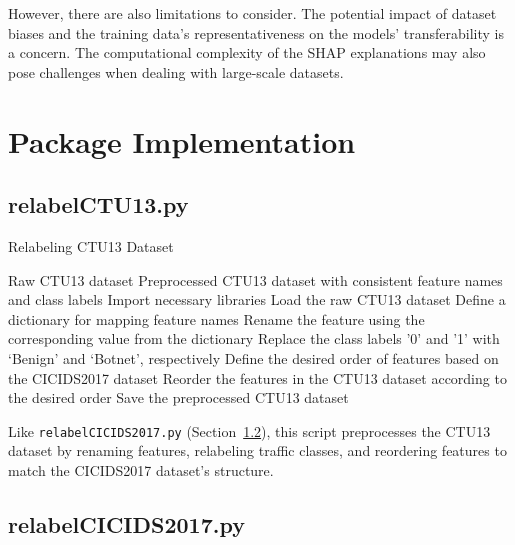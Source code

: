 However, there are also limitations to consider. The potential impact of dataset biases and the training data's representativeness on the models' transferability is a concern. The computational complexity of the SHAP explanations may also pose challenges when dealing with large-scale datasets.

\section{Package Implementation}\label{sec:package-implementation}

\subsection{relabelCTU13.py}\label{subsec:relabelCTU13.py}

\begin{algorithm}[H]
\caption{Relabeling CTU13 Dataset}\label{alg:relabelCTU13}
\begin{algorithmic}[1]
\Require%
Raw CTU13 dataset
\Ensure%
Preprocessed CTU13 dataset with consistent feature names and class labels
\State%
Import necessary libraries
\State%
Load the raw CTU13 dataset
\State%
Define a dictionary for mapping feature names
        \State%
        Rename the feature using the corresponding value from the dictionary
    \EndIf%
\EndFor%
\State%
Replace the class labels '0' and '1' with `Benign' and `Botnet', respectively 
\State%
Define the desired order of features based on the CICIDS2017 dataset
\State%
Reorder the features in the CTU13 dataset according to the desired order
\State%
Save the preprocessed CTU13 dataset
\end{algorithmic}
\end{algorithm}

Like \texttt{relabelCICIDS2017.py} (Section~\ref{subsec:relabelCICIDS2017.py}), this script preprocesses the CTU13 dataset by renaming features, relabeling traffic classes, and reordering features to match the CICIDS2017 dataset's structure.

\subsection{relabelCICIDS2017.py}\label{subsec:relabelCICIDS2017.py}

